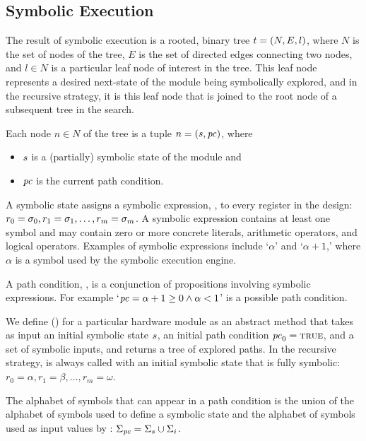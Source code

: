 \subsection{Symbolic Execution}
The result of symbolic execution is a rooted, binary tree $t = (N, E, l)$, where
$N$ is the set of nodes of the tree, $E$ is the set of directed edges connecting
two nodes, and $l \in N$ is a particular leaf node of interest in the tree. This
leaf node represents a desired next-state of the module being symbolically
explored, and in the recursive strategy, it is this leaf node that is joined to
the root node of a subsequent tree in the search.

Each node $n \in N$ of the tree is a tuple $n = (s, \mathit{pc})$, where
\begin{itemize}
\item $s$ is a (partially) symbolic state of the module and
\item $\mathit{pc}$ is the current path condition.
\end{itemize}

A symbolic state assigns a symbolic expression, \symexpression, to every register in the design: $r_0 =
\sigma_0, r_1 = \sigma_1, \ldots, r_m = \sigma_m$. A symbolic expression
\symexpression{} contains at least one symbol and may contain zero or more concrete
literals, arithmetic operators, and logical operators. Examples of
symbolic expressions include `$\alpha$' and `$\alpha + 1$,' where
$\alpha$ is a symbol used by the symbolic execution engine.

A path condition, \pathcondition, is a conjunction of propositions involving
symbolic expressions. For example `$\mathit{pc} = \alpha + 1 \ge 0 \wedge \alpha < 1$' is a
possible path condition.

We define \symexecution() for a particular hardware module as an abstract method
that takes as input an initial symbolic
state $s$, an initial path condition $\mathit{pc}_0 = \mathtt{\textsc{true}}$, and a
set of symbolic inputs, and 
returns a tree of explored paths. In the recursive strategy, \symexecution{} is
always called with an initial
symbolic state that is fully symbolic: $r_0 = \alpha, r_1 = \beta, \ldots, r_m = \omega$.

The alphabet of symbols that can appear in a path condition is the union of the
alphabet of symbols used to define a symbolic state and the alphabet of symbols
used as input values by \symexecution{}: $\Sigma_{\mathit{pc}} = \Sigma_{s} \cup \Sigma_i$.


